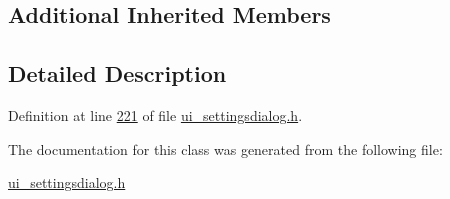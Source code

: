 \subsection*{Additional Inherited Members}


\subsection{Detailed Description}


Definition at line \hyperlink{a00054_source_l00221}{221} of file \hyperlink{a00054_source}{ui\+\_\+settingsdialog.\+h}.



The documentation for this class was generated from the following file\+:\begin{DoxyCompactItemize}
\item 
\hyperlink{a00054}{ui\+\_\+settingsdialog.\+h}\end{DoxyCompactItemize}
